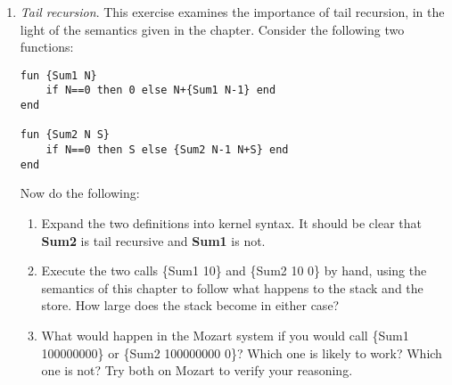 \documentclass[11pt]{article}
\begin{document}
\begin{enumerate}
{\bfseries Solution}: The ability to pass functions as arguments is known as higher-order programming
\\\\
(a) part
\begin{verbatim}
local
    fun{AndThen BP1 BP2}
        if {BP1} then {BP2} else false end
    end
in    
    {Browse {AndThen fun {$} a==a end fun{$} 'success' end}} 
    % prints success
end    
\end{verbatim}
is the same as
\begin{verbatim}
local
    fun {Test}
        a==a andthen 'success'
    end
in    
    {Browse {Test}} % prints success
end    
\end{verbatim}

\(\langle{expression}\rangle_2\) is not evaluated if \(\langle{expression}\rangle_1\) is false
\\\\
(b) part

\begin{verbatim}
local
    fun{OrElse BP1 BP2}
        if {BP1} then true else {BP2} end
    end
in    
    {Browse {OrElse fun {$} a==b end fun{$} 'success' end}} 
    % prints success
end    
\end{verbatim}
\newpage
is the same as
\begin{verbatim}
local
    fun {Test}
        a==b orelse 'success'
    end
in    
    {Browse {Test}} % prints success
end    
\end{verbatim}
\(\langle{expression}\rangle_2\) is not evaluated if \(\langle{expression}\rangle_1\) is true

\item {\itshape Tail recursion}. This exercise examines the importance of tail recursion, in the
light of the semantics given in the chapter. Consider the following two functions:
\begin{verbatim}
fun {Sum1 N}
    if N==0 then 0 else N+{Sum1 N-1} end
end

fun {Sum2 N S}
    if N==0 then S else {Sum2 N-1 N+S} end
end
\end{verbatim}
Now do the following:
\begin{enumerate}
\item Expand the two deﬁnitions into kernel syntax. It should be clear that {\bfseries Sum2}
is tail recursive and {\bfseries Sum1} is not.
\item Execute the two calls \{Sum1 10\} and \{Sum2 10 0\} by hand, using the
semantics of this chapter to follow what happens to the stack and the store.
How large does the stack become in either case?
\item What would happen in the Mozart system if you would call \{Sum1
100000000\} or \{Sum2 100000000 0\}? Which one is likely to work? Which
one is not? Try both on Mozart to verify your reasoning.
\end{enumerate}


\end{enumerate}
\end{document}

